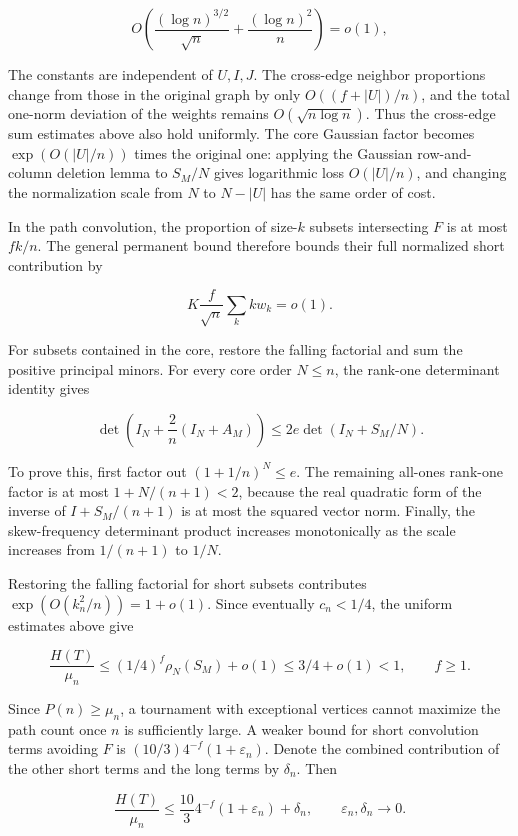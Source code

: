 \documentclass[11pt,a4paper]{article}
\begin{document}
\[
O\!\left(\frac{(\log n)^{3/2}}{\sqrt n}+\frac{(\log n)^2}{n}\right)=o(1),
\]

The constants are independent of \(U,I,J\). The cross-edge neighbor proportions change from those in the original graph by only \(O((f+|U|)/n)\), and the total one-norm deviation of the weights remains \(O(\sqrt{n\log n})\). Thus the cross-edge sum estimates above also hold uniformly. The core Gaussian factor becomes \(\exp(O(|U|/n))\) times the original one: applying the Gaussian row-and-column deletion lemma to \(S_M/N\) gives logarithmic loss \(O(|U|/n)\), and changing the normalization scale from \(N\) to \(N-|U|\) has the same order of cost.

In the path convolution, the proportion of size-\(k\) subsets intersecting \(F\) is at most \(fk/n\). The general permanent bound therefore bounds their full normalized short contribution by

\[
K\frac f{\sqrt n}\sum_k kw_k=o(1).
\]

For subsets contained in the core, restore the falling factorial and sum the positive principal minors. For every core order \(N\le n\), the rank-one determinant identity gives

\[
\det\left(I_N+\frac2n(I_N+A_M)\right)
\le2e\det(I_N+S_M/N).
\]

To prove this, first factor out \((1+1/n)^N\le e\). The remaining all-ones rank-one factor is at most \(1+N/(n+1)<2\), because the real quadratic form of the inverse of \(I+S_M/(n+1)\) is at most the squared vector norm. Finally, the skew-frequency determinant product increases monotonically as the scale increases from \(1/(n+1)\) to \(1/N\).

Restoring the falling factorial for short subsets contributes \(\exp(O(k_n^2/n))=1+o(1)\). Since eventually \(c_n<1/4\), the uniform estimates above give

\[
\frac{H(T)}{\mu_n}
\le(1/4)^f\rho_N(S_M)+o(1)
\le 3/4+o(1)<1,\qquad f\ge1.
\]

Since \(P(n)\ge\mu_n\), a tournament with exceptional vertices cannot maximize the path count once \(n\) is sufficiently large. A weaker bound for short convolution terms avoiding \(F\) is \((10/3)4^{-f}(1+\varepsilon_n)\). Denote the combined contribution of the other short terms and the long terms by \(\delta_n\). Then

\begin{equation}
\frac{H(T)}{\mu_n}\le\frac{10}{3}4^{-f}(1+\varepsilon_n)+\delta_n,
\qquad \varepsilon_n,\delta_n\longrightarrow0.
\tag{7.1}
\label{eq-exceptional-bound}
\end{equation}
\end{document}
